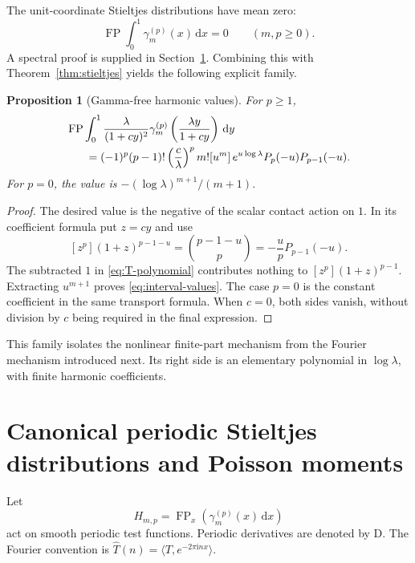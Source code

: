\documentclass[11pt]{article}
\newtheorem{proposition}[theorem]{Proposition}
\theoremstyle{definition}\newtheorem{definition}[theorem]{Definition}
\theoremstyle{remark}\newtheorem{remark}[theorem]{Remark}
\DeclareMathOperator{\FP}{FP}
\newcommand{\dd}{\,\mathrm d}
\newcommand{\ii}{\mathrm i}
\newcommand{\D}{\mathrm D}
\begin{document}
The unit-coordinate Stieltjes distributions have mean zero:
\begin{equation}\label{eq:mean-zero}
\FP\int_0^1\gamma_m^{(p)}(x)\dd x=0\qquad(m,p\ge0).
\end{equation}
A spectral proof is supplied in Section~\ref{sec:fourier}. Combining this with Theorem~\ref{thm:stieltjes} yields the following explicit family.

\begin{proposition}[Gamma-free harmonic values]\label{prop:interval-mobius}
For $p\ge1$,
\begin{align}\label{eq:interval-values}
&\FP\int_0^1\frac{\lambda}{(1+cy)^2}
\gamma_m^{(p)}\left(\frac{\lambda y}{1+cy}\right)\dd y\\
&\hspace{6mm}=(-1)^p(p-1)!\left(\frac c\lambda\right)^p
m![u^m]\,e^{u\log\lambda}P_p(-u)P_{p-1}(-u).\notag
\end{align}
For $p=0$, the value is $-(\log\lambda)^{m+1}/(m+1)$.
\end{proposition}
\begin{proof}
The desired value is the negative of the scalar contact action on $1$. In its coefficient formula put $z=cy$ and use
\[
[z^p](1+z)^{p-1-u}=\binom{p-1-u}{p}
=-\frac upP_{p-1}(-u).
\]
The subtracted $1$ in \eqref{eq:T-polynomial} contributes nothing to $[z^p](1+z)^{p-1}$. Extracting $u^{m+1}$ proves \eqref{eq:interval-values}. The case $p=0$ is the constant coefficient in the same transport formula. When $c=0$, both sides vanish, without division by $c$ being required in the final expression.
\end{proof}
This family isolates the nonlinear finite-part mechanism from the Fourier mechanism introduced next. Its right side is an elementary polynomial in $\log\lambda$, with finite harmonic coefficients.

\section{Canonical periodic Stieltjes distributions and Poisson moments}
\label{sec:fourier}
Let
\begin{equation}\label{eq:Hmp}
H_{m,p}=\FP_x(\gamma_m^{(p)}(x)\dd x)
\end{equation}
act on smooth periodic test functions. Periodic derivatives are denoted by $\D$. The Fourier convention is $\widehat T(n)=\langle T,e^{-2\pi\ii nx}\rangle$.
\end{document}
